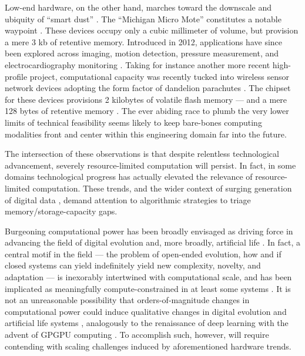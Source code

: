 Low-end hardware, on the other hand, marches toward the downscale and ubiquity of ``smart dust'' \citep{warneke2001smart}.
The ``Michigan Micro Mote'' constitutes a notable waypoint \citep{lee2012modular}.
These devices occupy only a cubic millimeter of volume, but provision a mere 3 kb of retentive memory.
Introduced in 2012, applications have since been explored across imaging, motion detection, pressure measurement, and electrocardiography monitoring \citep{lee2015review}.
Taking for instance another more recent high-profile project, computational capacity was recently tucked into wireless sensor network devices adopting the form factor of dandelion parachutes \citep{iyer2022wind}.
The chipset for these devices provisions 2 kilobytes of volatile flash memory --- and a mere 128 bytes of retentive memory \citep{microchip2014atiny20}.
The ever abiding race to plumb the very lower limits of technical feasibility seems likely to keep bare-bones computing modalities front and center within this engineering domain far into the future.

The intersection of these observations is that despite relentless technological advancement, severely resource-limited computation will persist.
In fact, in some domains technological progress has actually elevated the relevance of resource-limited computation.
These trends, and the wider context of surging generation of digital data \citep{bhat2018data}, demand attention to algorithmic strategies to triage memory/storage-capacity gaps.

Burgeoning computational power has been broadly envisaged as driving force in advancing the field of digital evolution and, more broadly, artificial life \citep{ackley2014indefinitely}.
In fact, a central motif in the field --- the problem of open-ended evolution, how and if closed systems can yield indefinitely yield new complexity, novelty, and adaptation --- is inexorably intertwined with computational scale, and has been implicated as meaningfully compute-constrained in at least some systems \citep{taylor2016open,channon2019maximum}.
It is not an unreasonable possibility that orders-of-magnitude changes in computational power could induce qualitative changes in digital evolution and artificial life systems \citep{moreno2022engineering}, analogously to the renaissance of deep learning with the advent of GPGPU computing \citep{krizhevsky2012imagenet}.
To accomplish such, however, will require contending with scaling challenges induced by aforementioned hardware trends.

